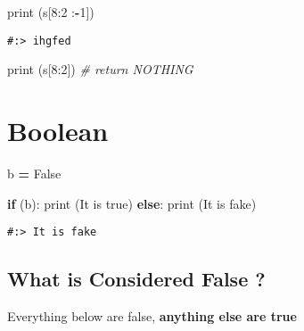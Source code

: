 \documentclass[
]{book}
\newenvironment{Shaded}{\begin{snugshade}}{\end{snugshade}}
\newcommand{\BuiltInTok}[1]{#1}
\newcommand{\CommentTok}[1]{\textcolor[rgb]{0.37,0.37,0.37}{\textit{#1}}}
\newcommand{\ControlFlowTok}[1]{\textcolor[rgb]{0.27,0.27,0.27}{\textbf{#1}}}
\newcommand{\DecValTok}[1]{\textcolor[rgb]{0.06,0.06,0.06}{#1}}
\newcommand{\NormalTok}[1]{#1}
\newcommand{\OperatorTok}[1]{\textcolor[rgb]{0.43,0.43,0.43}{\textbf{#1}}}
\newcommand{\StringTok}[1]{\textcolor[rgb]{0.5,0.5,0.5}{#1}}
\newcommand{\VariableTok}[1]{\textcolor[rgb]{0,0,0}{#1}}
\begin{document}
\begin{Shaded}
\begin{Highlighting}[]
\BuiltInTok{print}\NormalTok{ (s[}\DecValTok{8}\NormalTok{:}\DecValTok{2}\NormalTok{ :}\OperatorTok{{-}}\DecValTok{1}\NormalTok{])}
\end{Highlighting}
\end{Shaded}

\begin{verbatim}
#:> ihgfed
\end{verbatim}

\begin{Shaded}
\begin{Highlighting}[]
\BuiltInTok{print}\NormalTok{ (s[}\DecValTok{8}\NormalTok{:}\DecValTok{2}\NormalTok{])     }\CommentTok{\# return NOTHING}
\end{Highlighting}
\end{Shaded}

\hypertarget{boolean}{%
\section{Boolean}\label{boolean}}

\begin{Shaded}
\begin{Highlighting}[]
\NormalTok{b }\OperatorTok{=} \VariableTok{False}

\ControlFlowTok{if}\NormalTok{ (b):}
    \BuiltInTok{print}\NormalTok{ (}\StringTok{\textquotesingle{}It is true\textquotesingle{}}\NormalTok{)}
\ControlFlowTok{else}\NormalTok{:}
    \BuiltInTok{print}\NormalTok{ (}\StringTok{\textquotesingle{}It is fake\textquotesingle{}}\NormalTok{)}
\end{Highlighting}
\end{Shaded}

\begin{verbatim}
#:> It is fake
\end{verbatim}

\hypertarget{what-is-considered-false}{%
\subsection{What is Considered False ?}\label{what-is-considered-false}}

Everything below are false, \textbf{anything else are true}
\end{document}
